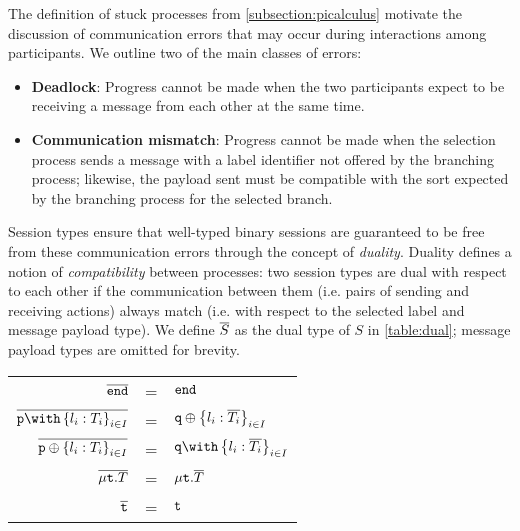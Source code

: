 \begin{prooftree}
\end{prooftree}

The definition of stuck processes 
from \cref{subsection:picalculus} 
motivate the discussion of communication errors 
that may occur during interactions among participants. 
We outline two of the main classes of errors:

\begin{itemize}
\item \textbf{Deadlock}: 
Progress cannot be made when the two participants 
expect to be receiving a message from each other at the same time.
\item \textbf{Communication mismatch}: 
Progress cannot be made when the selection process 
sends a message with a label identifier not 
offered by the branching process; 
likewise, the payload sent must be compatible 
with the sort expected by the branching process 
for the selected branch.
\end{itemize}

Session types ensure that 
well-typed binary sessions are guaranteed 
to be free from these communication errors 
through the concept of \textit{duality}. 
Duality defines a notion of \textit{compatibility}
 between processes: two session types are dual 
 with respect to each other if the communication 
 between them (i.e. pairs of sending and receiving actions)
 always match (i.e. with respect to the selected label 
 and message payload type). 
We define $\dual{S}$ as the dual type of $S$ in \cref{table:dual};
message payload types are omitted for brevity.

\renewcommand{\arraystretch}{1.6}
\begin{center}
\begin{tabular}{rcl}
$\dual{\tend}$ & = & $\tend$ \\
$\dual{\tbra{p}{l_i: T_i}{i\in I}}$ & = & 
	$\tsel{q}{l_i: \dual{T_i}}{i\in I}$ \\
$\dual{\tsel{p}{l_i: T_i}{i\in I}}$ & = & 
	$\tbra{q}{l_i: \dual{T_i}}{i\in I}$ \\
$\dual{\trec{T}}$ & = & $\trec{\dual{T}}$ \\
$\dual{\trecvar}$ & = & $\trecvar$ \\ 
\end{tabular}
\label{table:dual}
\end{center}
\renewcommand{\arraystretch}{1}

